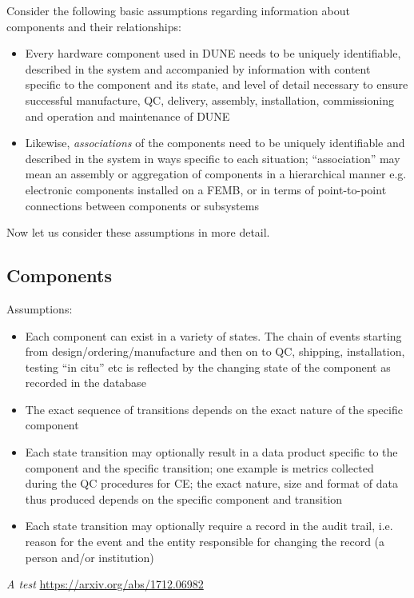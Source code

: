 \documentclass[pdftex,12pt,letter]{article}
\begin{document}
Consider the following basic assumptions regarding information about components and their relationships:

\begin{itemize}

\item Every hardware component used in DUNE needs to be uniquely identifiable, described in the
system and accompanied by information with content specific to the component and its state, and level
of detail necessary to ensure successful manufacture, QC, delivery, assembly, installation, commissioning
and operation and maintenance of DUNE

\item Likewise, \textit{associations} of the components need to be uniquely identifiable and described
in the system in ways specific to each situation; ``association'' may mean an assembly or aggregation of
components in a hierarchical manner e.g.\,electronic components installed on a FEMB, or in terms of
point-to-point connections between components or subsystems

\end{itemize}

\noindent Now let us consider these assumptions in more detail.

\subsection{Components}
Assumptions:

\begin{itemize}

\item Each component can exist in a variety of states. The chain of events starting from design/ordering/manufacture and
then on to QC, shipping, installation, testing ``in citu'' etc is reflected by the changing state of the component as recorded
in the database

\item The exact sequence of transitions depends on the exact nature of the specific  component

\item Each state transition may optionally result in a data product specific to the component and the specific transition;
one example is metrics collected during the QC procedures for CE; the exact nature, size and format of data thus produced
depends on the specific component and transition

\item Each state transition may optionally require a record in the audit trail, i.e.\,reason for the event and the entity
responsible for changing the record (a person and/or institution)

\end{itemize}



\clearpage

\begin{thebibliography}{1}

{\textit{A test} \url{https://arxiv.org/abs/1712.06982}}

\end{thebibliography}
\end{document}

